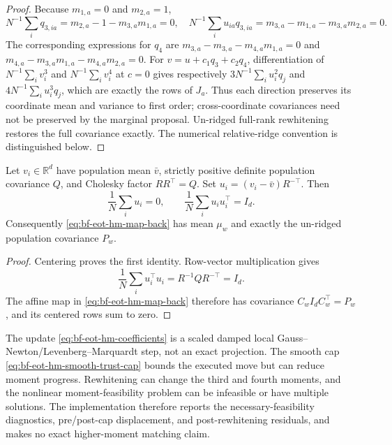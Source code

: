 \begin{proof}
Because \(m_{1,a}=0\) and \(m_{2,a}=1\),
\[
 N^{-1}\sum_iq_{3,ia}=m_{2,a}-1-m_{3,a}m_{1,a}=0,
 \quad
 N^{-1}\sum_i u_{ia}q_{3,ia}=m_{3,a}-m_{1,a}-m_{3,a}m_{2,a}=0.
\]
The corresponding expressions for \(q_4\) are
\(m_{3,a}-m_{3,a}-m_{4,a}m_{1,a}=0\) and
\(m_{4,a}-m_{3,a}m_{1,a}-m_{4,a}m_{2,a}=0\).
For \(v=u+c_1q_3+c_2q_4\), differentiation of
\(N^{-1}\sum_i v_i^3\) and \(N^{-1}\sum_i v_i^4\) at \(c=0\) gives
respectively \(3N^{-1}\sum_i u_i^2q_j\) and
\(4N^{-1}\sum_i u_i^3q_j\), which are exactly the rows of \(J_a\).
Thus each direction preserves its coordinate mean and variance to first
order; cross-coordinate covariances need not be preserved by the marginal
proposal.  Un-ridged full-rank rewhitening restores the full covariance
exactly.  The numerical relative-ridge convention is distinguished below.
\end{proof}

\begin{proposition}
\label{prop:bf-eot-hm-rewhitening}
Let \(v_i\in\mathbb R^d\) have population mean \(\bar v\), strictly positive
definite population covariance \(Q\), and Cholesky factor \(RR^\top=Q\).
Set \(u_i=(v_i-\bar v)R^{-\top}\).  Then
\begin{equation}
 \frac1N\sum_i u_i=0,
 \qquad
 \frac1N\sum_i u_i u_i^\top=I_d.
\end{equation}
Consequently \eqref{eq:bf-eot-hm-map-back} has mean \(\mu_w\) and exactly
the un-ridged population covariance \(P_w\).
\end{proposition}

\begin{proof}
Centering proves the first identity.  Row-vector multiplication gives
\[
 \frac1N\sum_i u_i^\top u_i=R^{-1}QR^{-\top}=I_d.
\]
The affine map in \eqref{eq:bf-eot-hm-map-back} therefore has covariance
\(C_wI_dC_w^\top=P_w\), and its centered rows sum to zero.
\end{proof}

The update \eqref{eq:bf-eot-hm-coefficients} is a scaled damped local
Gauss--Newton/Levenberg--Marquardt step, not an exact projection.  The smooth
cap \eqref{eq:bf-eot-hm-smooth-trust-cap} bounds the executed move but can
reduce moment progress.  Rewhitening can change the third and fourth moments,
and the nonlinear moment-feasibility problem can be infeasible or have multiple
solutions.  The implementation therefore reports the necessary-feasibility
diagnostics, pre/post-cap displacement, and post-rewhitening residuals, and
makes no exact higher-moment matching claim.

